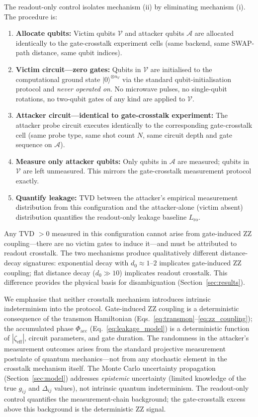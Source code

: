 \documentclass[ASNA,twocolumn]{USG}
\begin{document}
The readout-only control isolates mechanism (ii) by eliminating mechanism (i). The procedure is:

\begin{enumerate}
    \item \textbf{Allocate qubits:} Victim qubits $\mathcal{V}$ and attacker qubits $\mathcal{A}$ are allocated identically to the gate-crosstalk experiment cells (same backend, same SWAP-path distance, same qubit indices).
    \item \textbf{Victim circuit---zero gates:} Qubits in $\mathcal{V}$ are initialised to the computational ground state $|0\rangle^{\otimes n_V}$ via the standard qubit-initialisation protocol and \emph{never operated on}. No microwave pulses, no single-qubit rotations, no two-qubit gates of any kind are applied to $\mathcal{V}$.
    \item \textbf{Attacker circuit---identical to gate-crosstalk experiment:} The attacker probe circuit executes identically to the corresponding gate-crosstalk cell (same probe type, same shot count $N$, same circuit depth and gate sequence on $\mathcal{A}$).
    \item \textbf{Measure only attacker qubits:} Only qubits in $\mathcal{A}$ are measured; qubits in $\mathcal{V}$ are left unmeasured. This mirrors the gate-crosstalk measurement protocol exactly.
    \item \textbf{Quantify leakage:} TVD between the attacker's empirical measurement distribution from this configuration and the attacker-alone (victim absent) distribution quantifies the readout-only leakage baseline $L_{\mathrm{ro}}$.
\end{enumerate}

Any TVD $> 0$ measured in this configuration cannot arise from gate-induced ZZ coupling---there are no victim gates to induce it---and must be attributed to readout crosstalk. The two mechanisms produce qualitatively different distance-decay signatures: exponential decay with $d_0 \approx 1$--$2$ implicates gate-induced ZZ coupling; flat distance decay ($d_0 \gg 10$) implicates readout crosstalk. This difference provides the physical basis for disambiguation (Section~\ref{sec:results}).

We emphasise that neither crosstalk mechanism introduces intrinsic indeterminism into the protocol. Gate-induced ZZ coupling is a deterministic consequence of the transmon Hamiltonian (Eqs.~\ref{eq:transmon}--\ref{eq:zz_coupling}); the accumulated phase $\Phi_{\mathrm{acc}}$ (Eq.~\ref{eq:leakage_model}) is a deterministic function of $|\zeta_{\mathrm{eff}}|$, circuit parameters, and gate duration. The randomness in the attacker's measurement outcomes arises from the standard projective measurement postulate of quantum mechanics---not from any stochastic element in the crosstalk mechanism itself. The Monte Carlo uncertainty propagation (Section~\ref{sec:model}) addresses \emph{epistemic} uncertainty (limited knowledge of the true $g_{ij}$ and $\Delta_{ij}$ values), not intrinsic quantum indeterminism. The readout-only control quantifies the measurement-chain background; the gate-crosstalk excess above this background is the deterministic ZZ signal.
\end{document}
